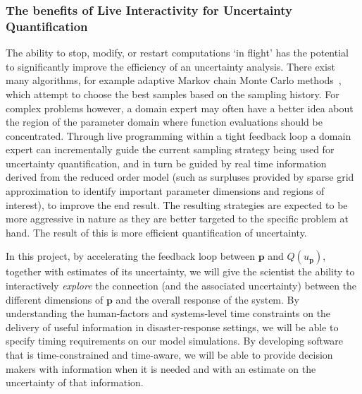 \subsubsection*{The benefits of Live Interactivity for Uncertainty
  Quantification}

The ability to stop, modify, or restart computations `in flight' has
the potential to significantly improve the efficiency of an
uncertainty analysis. There exist many algorithms, for example
adaptive Markov chain Monte Carlo methods~\parencite{GilksEtal1994}, 
which attempt to choose the best samples based on the sampling
history. For complex problems however, a domain expert
may often have
a better idea about the region of the parameter domain where function
evaluations should be concentrated. Through live programming within a
tight feedback loop a domain expert can incrementally guide the
current sampling strategy being used for uncertainty 
quantification, and in turn be guided by 
real time information derived from the reduced order model 
(such as surpluses
provided by sparse grid approximation to 
identify important parameter dimensions and regions of interest), 
to improve the end result. The resulting strategies are expected to be
more aggressive in nature as they are better targeted to the specific
problem at hand. The result of this is more efficient quantification of
uncertainty.

In this project, by accelerating the feedback loop between
$\mathbf{p}$ and $Q(u_{\mathbf{p}})$, together with estimates of its
uncertainty, we will give the scientist the ability to interactively
\emph{explore} the connection (and the associated uncertainty) between
the different dimensions of $\mathbf{p}$ and the overall response of
the system. By understanding the human-factors and systems-level time
constraints on the delivery of useful information in disaster-response
settings, we will be able to specify timing requirements on our model
simulations. By developing software that is time-constrained and
time-aware, we will be able to provide decision makers with
information when it is needed and with an estimate on the uncertainty
of that information.


